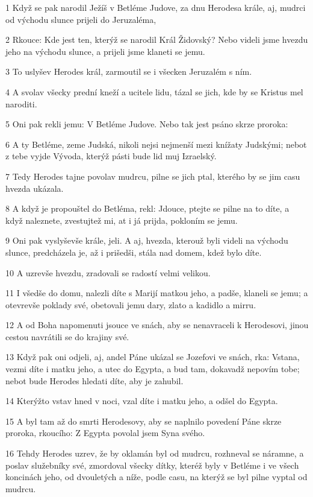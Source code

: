 \par 1 Když se pak narodil Ježíš v Betléme Judove, za dnu Herodesa krále, aj, mudrci od východu slunce prijeli do Jeruzaléma,
\par 2 Rkouce: Kde jest ten, kterýž se narodil Král Židovský? Nebo videli jsme hvezdu jeho na východu slunce, a prijeli jsme klaneti se jemu.
\par 3 To uslyšev Herodes král, zarmoutil se i všecken Jeruzalém s ním.
\par 4 A svolav všecky prední kneží a ucitele lidu, tázal se jich, kde by se Kristus mel naroditi.
\par 5 Oni pak rekli jemu: V Betléme Judove. Nebo tak jest psáno skrze proroka:
\par 6 A ty Betléme, zeme Judská, nikoli nejsi nejmenší mezi knížaty Judskými; nebot z tebe vyjde Vývoda, kterýž pásti bude lid muj Izraelský.
\par 7 Tedy Herodes tajne povolav mudrcu, pilne se jich ptal, kterého by se jim casu hvezda ukázala.
\par 8 A když je propouštel do Betléma, rekl: Jdouce, ptejte se pilne na to díte, a když naleznete, zvestujtež mi, at i já prijda, pokloním se jemu.
\par 9 Oni pak vyslyševše krále, jeli. A aj, hvezda, kterouž byli videli na východu slunce, predcházela je, až i prišedši, stála nad domem, kdež bylo díte.
\par 10 A uzrevše hvezdu, zradovali se radostí velmi velikou.
\par 11 I všedše do domu, nalezli díte s Marijí matkou jeho, a padše, klaneli se jemu; a otevrevše poklady své, obetovali jemu dary, zlato a kadidlo a mirru.
\par 12 A od Boha napomenuti jsouce ve snách, aby se nenavraceli k Herodesovi, jinou cestou navrátili se do krajiny své.
\par 13 Když pak oni odjeli, aj, andel Páne ukázal se Jozefovi ve snách, rka: Vstana, vezmi díte i matku jeho, a utec do Egypta, a bud tam, dokavadž nepovím tobe; nebot bude Herodes hledati díte, aby je zahubil.
\par 14 Kterýžto vstav hned v noci, vzal díte i matku jeho, a odšel do Egypta.
\par 15 A byl tam až do smrti Herodesovy, aby se naplnilo povedení Páne skrze proroka, rkoucího: Z Egypta povolal jsem Syna svého.
\par 16 Tehdy Herodes uzrev, že by oklamán byl od mudrcu, rozhneval se náramne, a poslav služebníky své, zmordoval všecky dítky, kteréž byly v Betléme i ve všech koncinách jeho, od dvouletých a níže, podle casu, na kterýž se byl pilne vyptal od mudrcu.
